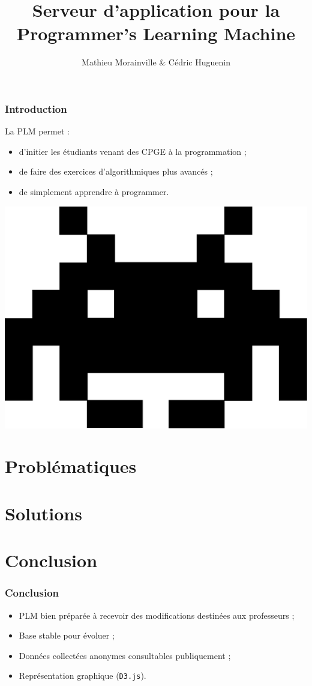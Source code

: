 \documentclass{beamer}
\title[Serveur d’application pour la PLM]{Serveur d’application pour la Programmer’s Learning Machine}
\subtitle{Mathieu Morainville \& Cédric Huguenin}
\institute{Encadrants : Martin Quinson \& Gérald Oster \\ TELECOM Nancy}
\begin{document}
 \begin{frame}
  \titlepage
 \end{frame}
 \begin{frame}
 	\frametitle{Introduction} %
 	La PLM permet :
 	\begin{itemize}
 	\item d'initier les étudiants venant des CPGE à la programmation ;
 	\item de faire des exercices d'algorithmiques plus avancés ;
 	\item de simplement apprendre à programmer.
 	\end{itemize}
 	\begin{center}
 	\onslide \includegraphics[scale=0.1]{images/buggle.eps}
 	\end{center}
 \end{frame}
  \begin{frame}
  \tableofcontents
 \end{frame}
\section{Problématiques}
	

\section{Solutions}
	
\section{Conclusion} %
	\begin{frame}
	\frametitle{Conclusion}
		\begin{itemize}
			\item PLM bien préparée à recevoir des modifications destinées aux professeurs ;
			\item Base stable pour évoluer ;
			\item Données collectées anonymes consultables publiquement ;
			\item Représentation graphique (\texttt{D3.js}).
		\end{itemize}
	\end{frame}	
\end{document}
